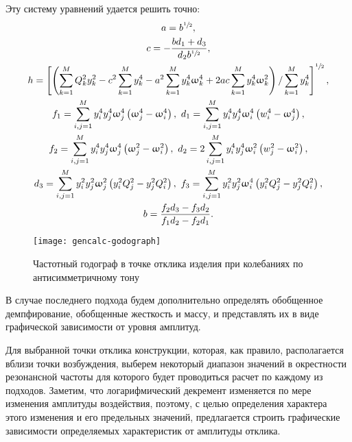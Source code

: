 Эту систему уравнений удается решить точно:
\begin{equation}
	\begin{gathered}
		a = b ^ {\sfrac{1}{2}}, \\
		c = -\frac{b d_1 + d_3}{d_2 b ^ {\sfrac{1}{2}}}, \\
		h = \left[ \left( \sum_{k = 1} ^ M Q_k ^ 2 y_k ^ 2 - c ^ 2 \sum_{k = 1} ^ M y_k ^ 4 - a ^ 2 \sum_{k = 1} ^ M y_k ^ 4 \upomega_k ^ 4 + 2 a c \sum_{k = 1} ^ M y_k ^ 4 \upomega_k ^ 2 \right) / \sum_{k = 1} ^ M y_k ^ 4 \right] ^ {\sfrac{1}{2}}, \\ 
		f_1 = \sum_{i, j = 1} ^ M y_i ^ 4 y_j ^ 4 \upomega_j ^ 4 \left( \upomega_j ^ 4 - \upomega_i ^ 4 \right), \ d_1 = \sum_{i, j = 1} ^ M y_i ^ 4 y_j ^ 4 \upomega_i ^ 4 \left( w_i ^ 4 - \upomega_j ^ 4 \right), \\
		f_2 = \sum_{i, j = 1} ^ M y_i ^ 4 y_j ^ 4 \upomega_j ^ 4 \left( \upomega_j ^ 2 - \upomega_i ^ 2 \right), \ d_2 = 2 \sum_{i, j = 1} ^ M y_i ^ 4 y_j ^ 4 \upomega_i ^ 2 \left( w_j ^ 2 - \upomega_i ^ 2 \right), \\
		d_3 = \sum_{i, j = 1} ^ M y_i ^ 2 y_j ^ 2 \upomega_j ^ 2 \left( y_i ^ 2 Q_j ^ 2 - y_j ^ 2 Q_i ^ 2 \right), \ f_3 = \sum_{i, j = 1} ^ M y_i ^ 2 y_j ^ 2 \upomega_i ^ 4 \left( y_i ^ 2 Q_j ^ 2 - y_j ^ 2 Q_i ^ 2 \right), \\
		b = \frac{f_2 d_3 - f_3 d_2}{f_1 d_2 - f_2 d_1}.
	\end{gathered}
	\label{eq:generalModalSolution}
\end{equation}

\begin{figure}[!htb]
	\centerfloat
	\texttt{[image: gencalc-godograph]}
	\caption{Частотный годограф в точке отклика изделия при колебаниях по антисимметричному тону} \label{fig:gencalc-godograph}
\end{figure}

В случае последнего подхода будем дополнительно определять обобщенное демпфирование, обобщенные жесткость и массу, и представлять их в виде графической зависимости от уровня амплитуд.

Для выбранной точки отклика конструкции, которая, как правило, располагается вблизи точки возбуждения, выберем некоторый диапазон значений в окрестности резонансной частоты для которого будет проводиться расчет по каждому из подходов. Заметим, что логарифмический декремент изменяется по мере изменения амплитуды воздействия, поэтому, с целью определения характера этого изменения и его предельных значений, предлагается
строить графические зависимости определяемых характеристик от амплитуды отклика.

